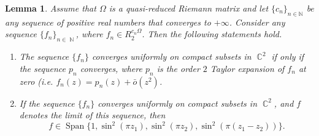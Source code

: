 \documentclass{amsart}
\numberwithin{equation}{section}
\newtheorem{lemma}[theorem]{Lemma}
\theoremstyle{definition}
\theoremstyle{remark}
\DeclareMathOperator{\Span}{Span}
\DeclareMathOperator{\CC}{\mathbb C}
\DeclareMathOperator{\NN}{\mathbb N}
\begin{document}
	\begin{lemma}\label{lemThetaConvergence}
		Assume that $\Omega$ is a quasi-reduced Riemann matrix and let $\{c_n\}_{n \in \mathbb N}$ be any sequence of positive real numbers that converges to $+\infty$. Consider any sequence $\{f_n\}_{n \in \NN}$, where $f_n \in R_2^{c_n \Omega}$. Then the following statements hold.
		\begin{enumerate}[label=(\roman*)]
			\item\label{thetaconvergencei} The sequence $\{f_n\}$ converges uniformly on compact subsets in $\CC^2$ if only if the sequence $p_n$ converges, where $p_n$ is the order $2$ Taylor expansion of $f_n$ at zero (i.e. $f_n(z) = p_n(z) + \bar{o}(z^2)$.
			\item\label{thetaconvergenceii} If the sequence $\{f_n\}$ converges uniformly on compact subsets in $\CC^2$, and $f$ denotes the limit of this sequence, then \[f \in \Span\{1, \sin^2(\pi z_1), \sin^2(\pi z_2),\sin^2(\pi(z_1 - z_2))\}.\]
		\end{enumerate}
	\end{lemma}
\end{document}
